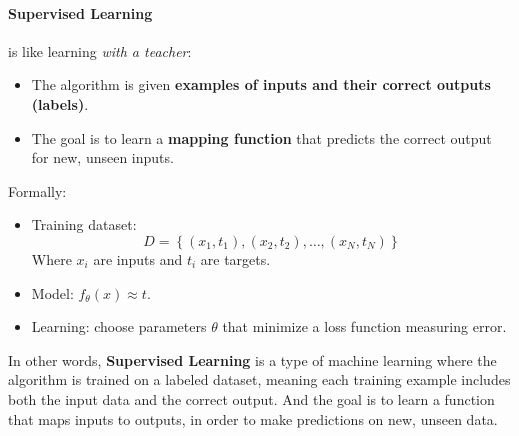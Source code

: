 \paragraph{Supervised Learning}

 is like learning \emph{with a teacher}:
\begin{itemize}
    \item The algorithm is given \textbf{examples of inputs and their correct outputs (labels)}.
    \item The goal is to learn a \textbf{mapping function} that predicts the correct output for new, unseen inputs.
\end{itemize}
Formally:
\begin{itemize}
    \item Training dataset:
    \begin{equation*}
        D = \left\{\left(x_{1}, t_{1}\right), \left(x_{2}, t_{2}\right), \dots, \left(x_{N}, t_{N}\right)\right\}
    \end{equation*}
    Where $x_{i}$ are inputs and $t_{i}$ are targets.
    \item Model: $f_{\theta}(x) \approx t$.
    \item Learning: choose parameters $\theta$ that minimize a loss function measuring error.
\end{itemize}
In other words, \textbf{Supervised Learning} is a type of machine learning where the algorithm is trained on a labeled dataset, meaning each training example includes both the input data and the correct output. And the goal is to learn a function that maps inputs to outputs, in order to make predictions on new, unseen data.

